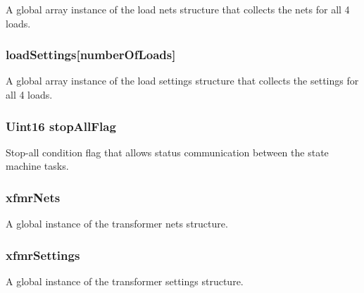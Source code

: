 A global array instance of the load nets structure that collects the nets for all 4 loads. \hypertarget{a00027_acb0d5fe43ffb1c0edbb3d22409a8f346}{
\subsubsection[{load\-Settings}]{ load\-Settings\mbox{[}number\-Of\-Loads\mbox{]}}}\label{a00027_acb0d5fe43ffb1c0edbb3d22409a8f346}
A global array instance of the load settings structure that collects the settings for all 4 loads. \hypertarget{a00027_af6530cd8f296ed6bf84f4ce75ea4c9ad}{
\subsubsection[{stop\-All\-Flag}]{\setlength{\rightskip}{0pt plus 5cm}Uint16 stop\-All\-Flag}}\label{a00027_af6530cd8f296ed6bf84f4ce75ea4c9ad}
Stop-\/all condition flag that allows status communication between the state machine tasks. \hypertarget{a00027_aec1d3b8f844d1d31ce7e703e50209432}{
\subsubsection[{xfmr\-Nets}]{ xfmr\-Nets}}\label{a00027_aec1d3b8f844d1d31ce7e703e50209432}
A global instance of the transformer nets structure. \hypertarget{a00027_ab8977a3c81ebfcd1b5dbe7fb49e9f832}{
\subsubsection[{xfmr\-Settings}]{ xfmr\-Settings}}\label{a00027_ab8977a3c81ebfcd1b5dbe7fb49e9f832}
A global instance of the transformer settings structure. 